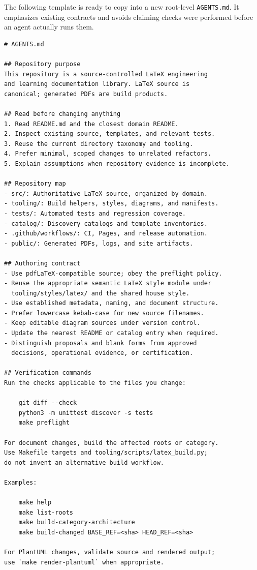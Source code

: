 \documentclass[11pt,letterpaper]{article}
\begin{document}
The following template is ready to copy into a new root-level \texttt{AGENTS.md}. It emphasizes existing contracts and avoids claiming checks were performed before an agent actually runs them.

\begin{lstlisting}
# AGENTS.md

## Repository purpose
This repository is a source-controlled LaTeX engineering
and learning documentation library. LaTeX source is
canonical; generated PDFs are build products.

## Read before changing anything
1. Read README.md and the closest domain README.
2. Inspect existing source, templates, and relevant tests.
3. Reuse the current directory taxonomy and tooling.
4. Prefer minimal, scoped changes to unrelated refactors.
5. Explain assumptions when repository evidence is incomplete.

## Repository map
- src/: Authoritative LaTeX source, organized by domain.
- tooling/: Build helpers, styles, diagrams, and manifests.
- tests/: Automated tests and regression coverage.
- catalog/: Discovery catalogs and template inventories.
- .github/workflows/: CI, Pages, and release automation.
- public/: Generated PDFs, logs, and site artifacts.

## Authoring contract
- Use pdfLaTeX-compatible source; obey the preflight policy.
- Reuse the appropriate semantic LaTeX style module under
  tooling/styles/latex/ and the shared house style.
- Use established metadata, naming, and document structure.
- Prefer lowercase kebab-case for new source filenames.
- Keep editable diagram sources under version control.
- Update the nearest README or catalog entry when required.
- Distinguish proposals and blank forms from approved
  decisions, operational evidence, or certification.

## Verification commands
Run the checks applicable to the files you change:

    git diff --check
    python3 -m unittest discover -s tests
    make preflight

For document changes, build the affected roots or category.
Use Makefile targets and tooling/scripts/latex_build.py;
do not invent an alternative build workflow.

Examples:

    make help
    make list-roots
    make build-category-architecture
    make build-changed BASE_REF=<sha> HEAD_REF=<sha>

For PlantUML changes, validate source and rendered output;
use `make render-plantuml` when appropriate.


\end{lstlisting}
\end{document}
